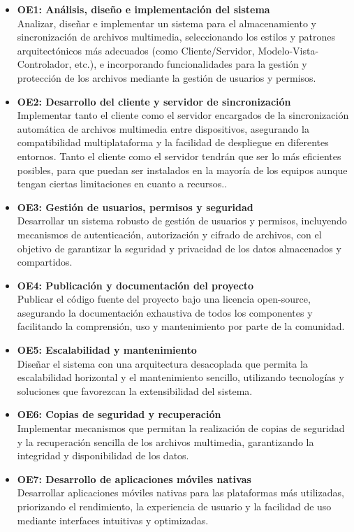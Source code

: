 \begin{itemize}
    \item \textbf{OE1: Análisis, diseño e implementación del sistema} \\
    Analizar, diseñar e implementar un sistema para el almacenamiento y sincronización de archivos multimedia, seleccionando los estilos y patrones arquitectónicos más adecuados (como Cliente/Servidor, Modelo-Vista-Controlador, etc.), e incorporando funcionalidades para la gestión y protección de los archivos mediante la gestión de usuarios y permisos.

    \item \textbf{OE2: Desarrollo del cliente y servidor de sincronización} \\
    Implementar tanto el cliente como el servidor encargados de la sincronización automática de archivos multimedia entre dispositivos, asegurando la compatibilidad multiplataforma y la facilidad de despliegue en diferentes entornos.
    Tanto el cliente como el servidor tendrán que ser lo más eficientes posibles, para que puedan ser instalados en la mayoría de los equipos aunque tengan ciertas limitaciones en cuanto a recursos..

    \item \textbf{OE3: Gestión de usuarios, permisos y seguridad} \\
    Desarrollar un sistema robusto de gestión de usuarios y permisos, incluyendo mecanismos de autenticación, autorización y cifrado de archivos, con el objetivo de garantizar la seguridad y privacidad de los datos almacenados y compartidos.

    \item \textbf{OE4: Publicación y documentación del proyecto} \\
    Publicar el código fuente del proyecto bajo una licencia open-source, asegurando la documentación exhaustiva de todos los componentes y facilitando la comprensión, uso y mantenimiento por parte de la comunidad.

    \item \textbf{OE5: Escalabilidad y mantenimiento} \\
    Diseñar el sistema con una arquitectura desacoplada que permita la escalabilidad horizontal y el mantenimiento sencillo, utilizando tecnologías y soluciones que favorezcan la extensibilidad del sistema.

    \item \textbf{OE6: Copias de seguridad y recuperación} \\
    Implementar mecanismos que permitan la realización de copias de seguridad y la recuperación sencilla de los archivos multimedia, garantizando la integridad y disponibilidad de los datos.

    \item \textbf{OE7: Desarrollo de aplicaciones móviles nativas} \\
    Desarrollar aplicaciones móviles nativas para las plataformas más utilizadas, priorizando el rendimiento, la experiencia de usuario y la facilidad de uso mediante interfaces intuitivas y optimizadas.
\end{itemize}


